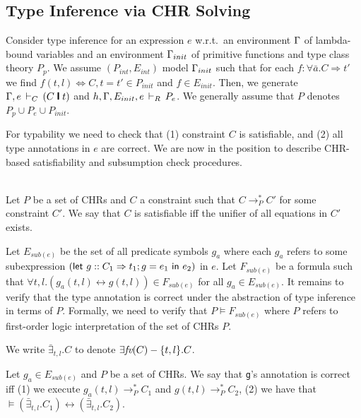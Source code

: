 \documentclass{article}
\renewcommand{\implies}[0]{\supset}
\newcommand{\simparrow}[0]{\Longleftrightarrow}
\newcommand{\rightarrowtail}{\longrightarrow}
\newcommand{\gd}[0]{~\rule{0.5mm}{2.5mm}~}
\newcommand{\tcons}{\, \vdash_{\scriptsize C} \,}
\newcommand{\tdef}{\, \vdash_{\scriptsize R} \,}
\begin{document}
\subsection{Type Inference via CHR Solving}

Consider type inference for an expression $e$ w.r.t.~an environment $\Gamma$ of lambda-bound variables
and an environment $\Gamma_{init}$ of primitive functions and
type class theory $P_p$. We assume $(P_{int},E_{int})$ model $\Gamma_{init}$
such that for each $f:\forall \bar{a}.C \Rightarrow t'$ we find $f(t,l) \simparrow C,t=t' \in P_{init}$
and $f\in E_{init}$.
Then, we generate $\tenv, e \tcons (C \gd t)$ and 
$h,\tenv, E_{init}, e \tdef P_e$. We generally assume that $P$ denotes $P_p \cup P_e \cup P_{init}$.


For typability we need to check that (1) constraint $C$ is satisfiable, and
(2) all type annotations in $e$ are correct.
We are now in the position to describe CHR-based satisfiability and subsumption
check procedures.


\begin{definition} \label{def:sat} \mbox{} \\
Let $P$ be a set of CHRs and $C$ a constraint such that
$C \rightarrowtail^*_P C'$ for some constraint $C'$.
We say that $C$ is satisfiable iff the unifier of all equations in $C'$ exists.
\end{definition}

Let $E_{sub(e)}$ be the set of all predicate symbols $g_a$ where each $g_a$ refers to
some subexpression $(\mbox{\sf let}\ g :: C_1 \Rightarrow t_1; g = e_1 ~\mbox{\sf in}\ e_2)$ in $e$.
Let $F_{sub(e)}$ be a formula such that $\forall t,l.(g_a(t,l)\leftrightarrow g(t,l)) \in F_{sub(e)}$
for all $g_a \in E_{sub(e)}$.
It remains to verify that  the type annotation is correct under the abstraction of type inference in terms of $P$.
Formally, we need to verify that
$P \models F_{sub(e)}$ where $P$ refers to first-order logic 
interpretation of the set of CHRs $P$. 

We write $\bar{\exists}_{t,l}.C$ to denote
$\exists\mbox{\it fv}(C)-\{t,l\}.C$.

\begin{definition} \label{def:sub}
Let $g_a\in E_{sub(e)}$ and $P$ be a set of CHRs.
We say that {\tt g}'s annotation is correct iff
(1) we execute $g_a(t,l) \rightarrowtail^*_P C_1$
and $g(t,l) \rightarrowtail^*_P C_2$,
(2) we have that $\models (\bar{\exists}_{t,l}.C_1) \leftrightarrow  (\bar{\exists}_{t,l}.C_2)$.
\end{definition}
\end{document}
